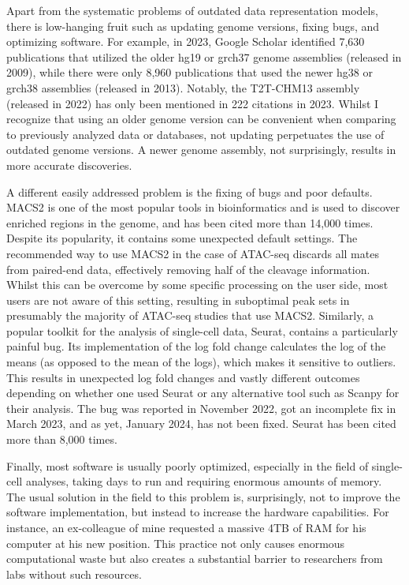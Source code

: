 Apart from the systematic problems of outdated data representation models, there is low-hanging fruit such as updating genome versions, fixing bugs, and optimizing software. For example, in 2023, Google Scholar identified 7,630 publications that utilized the older hg19 or grch37 genome assemblies (released in 2009), while there were only 8,960 publications that used the newer hg38 or grch38 assemblies (released in 2013). Notably, the T2T-CHM13 assembly (released in 2022) has only been mentioned in 222 citations in 2023. Whilst I recognize that using an older genome version can be convenient when comparing to previously analyzed data or databases, not updating perpetuates the use of outdated genome versions. A newer genome assembly, not surprisingly, results in more accurate discoveries\cite{Aganezov2022,Pan2019}. 

A different easily addressed problem is the fixing of bugs and poor defaults. MACS2 is one of the most popular tools in bioinformatics and is used to discover enriched regions in the genome, and has been cited more than 14,000 times\cite{Zhang2008}. Despite its popularity, it contains some unexpected default settings. The recommended way to use MACS2 in the case of ATAC-seq discards all mates from paired-end data, effectively removing half of the cleavage information\cite{Gaspar2018}. Whilst this can be overcome by some specific processing on the user side, most users are not aware of this setting, resulting in suboptimal peak sets in presumably the majority of ATAC-seq studies that use MACS2. Similarly, a popular toolkit for the analysis of single-cell data, Seurat, contains a particularly painful bug. Its implementation of the log fold change calculates the log of the means (as opposed to the mean of the logs), which makes it sensitive to outliers. This results in unexpected log fold changes and vastly different outcomes depending on whether one used Seurat or any alternative tool such as Scanpy for their analysis. The bug was reported in November 2022, got an incomplete fix in March 2023, and as yet, January 2024, has not been fixed\cite{WatsonHaigh}. Seurat has been cited more than 8,000 times. 

Finally, most software is usually poorly optimized, especially in the field of single-cell analyses, taking days to run and requiring enormous amounts of memory\cite{Pratapa_2020}. The usual solution in the field to this problem is, surprisingly, not to improve the software implementation, but instead to increase the hardware capabilities. For instance, an ex-colleague of mine requested a massive 4TB of RAM for his computer at his new position. This practice not only causes enormous computational waste but also creates a substantial barrier to researchers from labs without such resources.

